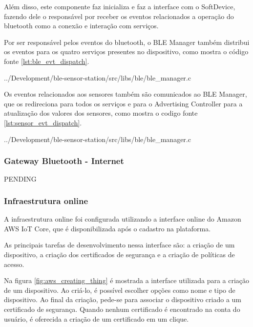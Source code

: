 Além disso, este componente faz inicializa e faz a interface
com o SoftDevice, fazendo dele o responsável por receber os eventos relacionados
a operação do bluetooth como a conexão e interação com serviços.

Por ser responsável pelos eventos do bluetooth, o BLE Manager também distribui
os eventos para os quatro serviços presentes no dispositivo, como mostra o
código fonte \ref{lst:ble_evt_dispatch}.

\begin{minipage}{0.95\linewidth} 
 {../Development/ble-sensor-station/src/libs/ble/ble_manager.c}
\end{minipage}


Os eventos relacionados aos sensores também são comunicados ao BLE Manager, que
os redireciona para todos os serviços e para o Advertising Controller para a
atualização dos valores dos sensores, como mostra o codigo fonte
\ref{lst:sensor_evt_dispatch}.

\begin{minipage}{0.95\linewidth} 
 {../Development/ble-sensor-station/src/libs/ble/ble_manager.c}
\end{minipage}



\subsubsection{Gateway Bluetooth - Internet}
PENDING

\subsubsection{Infraestrutura online}

A infraestrutura online foi configurada utilizando a interface online do Amazon
AWS IoT Core, que é disponibilizada após o cadastro na plataforma.

As principais tarefas de desenvolvimento nessa interface são: a criação de um
dispositivo, a criação dos certificados de segurança e a criação de políticas de
acesso.

Na figura \ref{fig:aws_creating_thing} é mostrada a interface utilizada para a
criação de um dispositivo. Ao criá-lo, é possível escolher opções como nome
e tipo de dispositivo. Ao final da criação, pede-se para associar o dispositivo
criado a um certificado de segurança. Quando nenhum certificado é encontrado na
conta do usuário, é oferecida a criação de um certificado em um clique.

